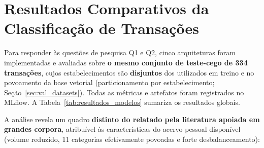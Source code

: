 \section{Resultados Comparativos da Classificação de Transações}
\label{sec:val_resultados_classificacao}

Para responder às questões de pesquisa Q1 e Q2, cinco arquiteturas foram implementadas e
avaliadas sobre \textbf{o mesmo conjunto de teste-cego de 334 transações}, cujos
estabelecimentos são \textbf{disjuntos} dos utilizados em treino e no povoamento da base
vetorial (particionamento por estabelecimento; Seção~\ref{sec:val_datasets}). Todas as
métricas e artefatos foram registrados no MLflow. A Tabela~\ref{tab:resultados_modelos}
sumariza os resultados globais.

\begin{table}[htb]
	\centering
	\caption{Comparativo global de desempenho preditivo e tempo médio de inferência (teste-cego de 334 transações, estabelecimentos disjuntos).}
	\label{tab:resultados_modelos}
\end{table}


A análise revela um quadro \textbf{distinto do relatado pela literatura apoiada em grandes
corpora}, atribuível às características do acervo pessoal disponível (volume reduzido,
11 categorias efetivamente povoadas e forte
desbalanceamento):

